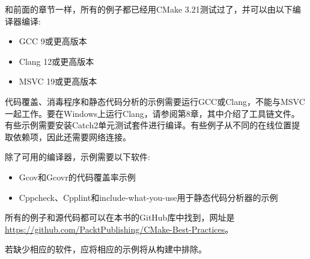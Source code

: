 和前面的章节一样，所有的例子都已经用CMake 3.21测试过了，并可以由以下编译器编译:

\begin{itemize}
\item 
GCC 9或更高版本

\item 
Clang 12或更高版本

\item 
MSVC 19或更高版本
\end{itemize}

代码覆盖、消毒程序和静态代码分析的示例需要运行GCC或Clang，不能与MSVC一起工作。要在Windows上运行Clang，请参阅第8章，其中介绍了工具链文件。有些示例需要安装Catch2单元测试套件进行编译。有些例子从不同的在线位置提取依赖项，因此还需要网络连接。 

除了可用的编译器，示例需要以下软件:

\begin{itemize}
\item 
Gcov和Gcovr的代码覆盖率示例
	
\item 
Cppcheck、Cpplint和include-what-you-use用于静态代码分析器的示例
\end{itemize}

所有的例子和源代码都可以在本书的GitHub库中找到，网址是\url{https://github.com/PacktPublishing/CMake-Best-Practices}。 

若缺少相应的软件，应将相应的示例将从构建中排除。






























